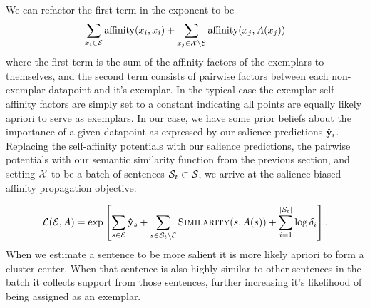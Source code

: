  We can refactor the first term in the exponent to be 
\[ \sum_{x_i \in \mathcal{E}} \operatorname{affinity}(x_i, x_i) +
 \sum_{x_j \in \mathcal{X} \setminus \mathcal{E}} \operatorname{affinity}(x_j, A(x_j))
 \]
where the first term is the sum of the affinity factors of the exemplars 
to themselves,
and the second term consists of  pairwise factors between each non-exemplar 
datapoint 
and it's exemplar. In the typical case the exemplar self-affinity factors are 
simply 
set to a constant indicating all points are equally likely apriori to serve
as exemplars. In our case, we have some prior beliefs about the importance of 
a given datapoint as expressed by our salience predictions $\mathbf{\hat{y}}_i$.
Replacing the self-affinity potentials with our salience predictions, 
the pairwise potentials with our semantic similarity function from the 
previous section, and setting $\mathcal{X}$ to be a batch of sentences 
$\mathcal{S}_t \subset \mathcal{S}$,
we arrive at the salience-biased affinity propagation
objective:

 \[ \mathcal{L}(\mathcal{E}, A) = \exp\left[
         \sum_{s \in \mathcal{E}} \mathbf{\hat{y}}_{s}
     + \sum_{s \in \mathcal{S}_t \setminus \mathcal{E}} \textsc{Similarity}(s, A(s)) + \sum_{i=1}^{|\mathcal{S}_t|} \log\delta_i \right].
\] 
When we estimate a sentence to be more salient it is more likely apriori
to form a cluster center. When that sentence is also highly similar to other 
sentences in the batch it collects support from those sentences, further
increasing it's likelihood of being assigned as an exemplar.
 



